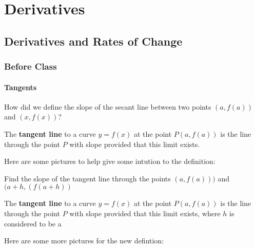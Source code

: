 \documentclass[notes]{subfiles}
\begin{document}
	\chapter{Derivatives}
	\setcounter{section}{1}
	\fancyhead[LO,RE]{\bfseries \currentname}
	\fancyfoot[C]{{}}
	\fancyfoot[RO,LE]{\large \thepage}	%
	
\section*{Derivatives and Rates of Change}\label{cs21}
	\subsection*{Before Class}
	\subsubsection*{Tangents}
		\begin{question}
			How did we define the slope of the secant line between two points $(a,f(a))$ and $(x,f(x))$?
		\end{question}
			\vspace*{1in}

		\begin{defn}
			The \textbf{tangent line} to a curve $y = f(x)$ at the point $P(a,f(a))$ is the line through the point $P$ with slope
			provided that this limit exists.
		\end{defn}
		Here are some pictures to help give some intution to the definition:

			\newpage
			
		\begin{ex}
			Find the slope of the tangent line through the points $(a,f(a)))$ and $(a+h,(f(a+h))$
		\end{ex}
			
		\begin{defn}
			The \textbf{tangent line} to a curve $y = f(x)$ at the point $P(a,f(a))$ is the line through the point $P$ with slope
			provided that this limit exists, where $h$ is considered to be a
		\end{defn}
		Here are some more pictures for the new defintion:
\end{document}
